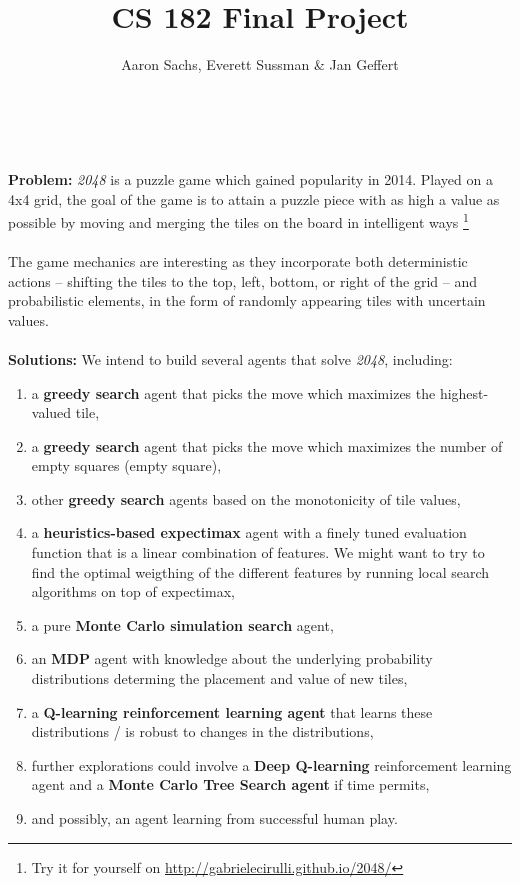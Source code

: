 \documentclass[11pt]{article}
\title{\vspace{-2cm}CS 182 Final Project}
\author{Aaron Sachs, Everett Sussman \& Jan Geffert}
\begin{document}
\maketitle
\noindent 
\\\\
\textbf{Problem: }\textit{2048} is a puzzle game which gained popularity in 2014. Played on a 4x4 grid, the goal of the game is to attain a puzzle piece with as high a value as possible by moving and merging the tiles on the board in intelligent ways \footnote{Try it for yourself on \url{http://gabrielecirulli.github.io/2048/}}
\\\\
The game mechanics are interesting as they incorporate both deterministic actions – shifting the tiles to the top, left, bottom, or right of the grid – and probabilistic elements, in the form of randomly appearing tiles with uncertain values.
\\\\
\textbf{Solutions: }We intend to build several agents that solve \textit{2048}, including:
\begin{enumerate}
\itemsep-0.1em
	\item a \textbf{greedy search} agent that picks the move which maximizes the highest-valued tile,
	\item a \textbf{greedy search} agent that picks the move which maximizes the number of empty squares (empty square),
    \item other \textbf{greedy search} agents based on the monotonicity of tile values,
	\item a \textbf{heuristics-based expectimax} agent with a finely tuned evaluation function that is a linear combination of features. We might want to try to find the optimal weigthing of the different features by running local search algorithms on top of expectimax,
	\item a pure \textbf{Monte Carlo simulation search} agent,
	\item an \textbf{MDP} agent with knowledge about the underlying probability distributions determing the placement and value of new tiles,
	\item a \textbf{Q-learning reinforcement learning agent} that learns these distributions / is robust to changes in the distributions,
	\item further explorations could involve a \textbf{Deep Q-learning} reinforcement learning agent and a \textbf{Monte Carlo Tree Search agent} if time permits, 
	\item and possibly, an agent learning from successful human play.
\end{enumerate}
\end{document}
